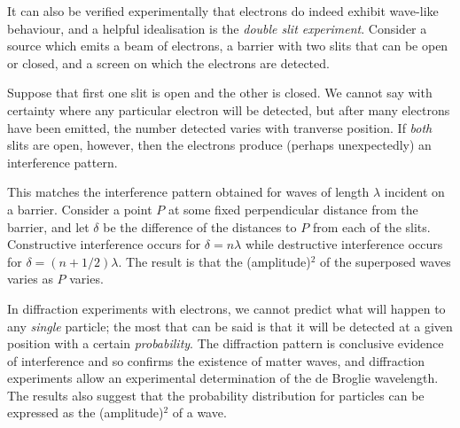 \documentclass[a4paper]{article}
\begin{document}
It can also be verified experimentally that electrons do indeed exhibit wave-like behaviour, and a helpful idealisation is the \emph{double slit experiment}. Consider a source which emits a beam of electrons, a barrier with two slits that can be open or closed, and a screen on which the electrons are detected. 

Suppose that first one slit is open and the other is closed. We cannot say with certainty where any particular electron will be detected, but after many electrons have been emitted, the number detected varies with tranverse position. If \emph{both} slits are open, however, then the electrons produce (perhaps unexpectedly) an interference pattern.

\begin{center}
\end{center}

This matches the interference pattern obtained for waves of length $ \lambda $ incident on a barrier. Consider a point $ P $ at some fixed perpendicular distance from the barrier, and let $ \delta $ be the difference of the distances to $ P $ from each of the slits. Constructive interference occurs for $ \delta = n \lambda $ while destructive interference occurs for $ \delta = (n + 1/2)\lambda $. The result is that the (amplitude)$^{2}$ of the superposed waves varies as $ P $ varies.

In diffraction experiments with electrons, we cannot predict what will happen to any \emph{single} particle; the most that can be said is that it will be detected at a given position with a certain \emph{probability}. The diffraction pattern is conclusive evidence of interference and so confirms the existence of matter waves, and diffraction experiments allow an experimental determination of the de Broglie wavelength. The results also suggest that the probability distribution for particles can be expressed as the (amplitude)$^{2}$ of a wave. 
 
\end{document}
